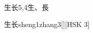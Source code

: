 \begin{entry}{生长}{5,4}{⽣、⾧}
  \begin{phonetics}{生长}{sheng1zhang3}[][HSK 3]
  \end{phonetics}
\end{entry}
